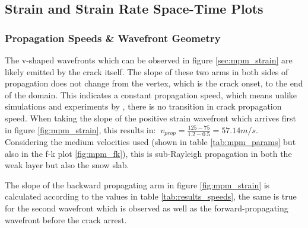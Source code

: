 

\subsection{Strain and Strain Rate Space-Time Plots}


\subsubsection{Propagation Speeds \& Wavefront Geometry}

The v-shaped wavefronts which can be observed in figure \ref{sec:mpm_strain} are likely emitted by the crack itself. The slope of these two arms in both sides of propagation does not change from the vertex, which is the crack onset, to the end of the domain. This indicates a constant propagation speed, which means unlike simulations and experiments by \cite{sironTheoreticalFrameworkDynamic2023,bergfeldSignaturesSubRayleighSupershear2025}, there is no transition in crack propagation speed. When taking the slope of the positive strain wavefront which arrives first in figure \ref{fig:mpm_strain}, this results in: $\ v_{prop} = \frac{125-75}{1.2-0.5} = 57.14 m/s$. Considering the medium velocities used (shown in table \ref{tab:mpm_params} but also in the f-k plot \ref{fig:mpm_fk}), this is sub-Rayleigh propagation in both the weak layer but also the snow slab. \par

The slope of the backward propagating arm in figure \ref{fig:mpm_strain} is calculated according to the values in table \ref{tab:results_speeds}, the same is true for the second wavefront which is observed as well as the forward-propagating wavefront before the crack arrest. 

